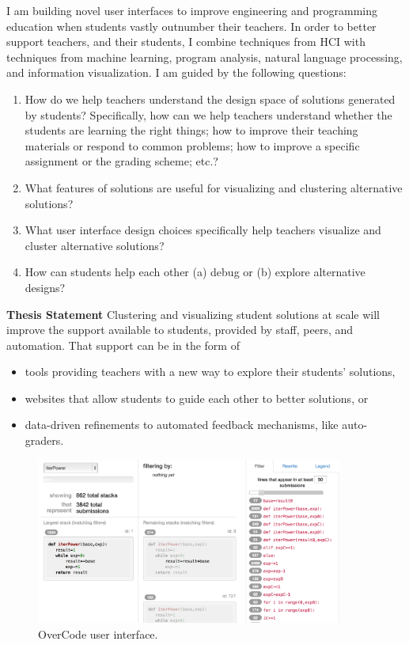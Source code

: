 \documentclass{sigchi}
\begin{document}
I am building novel user interfaces to improve engineering and programming education when students vastly outnumber their teachers. In order to better support teachers, and their students, I combine techniques from HCI with techniques from machine learning, program analysis, natural language processing, and information visualization. I am guided by the following questions:
\begin{enumerate}
\item How do we help teachers understand the design space of solutions generated by students? Specifically, how can we help teachers understand whether the students are learning the right things; how to improve their teaching materials or respond to common problems; how to improve a specific assignment or the grading scheme; etc.?
\item What features of solutions are useful for visualizing and clustering alternative solutions?
\item What user interface design choices specifically help teachers visualize and cluster alternative solutions?
\item How can students help each other (a) debug or (b) explore alternative designs?
\end{enumerate}

{\bf Thesis Statement} Clustering and visualizing student solutions at scale will improve the support available to students, provided by staff, peers, and automation. That support can be in the form of 
\begin{itemize}
\item tools providing teachers with a new way to explore their students' solutions,
\item websites that allow students to guide each other to better solutions, or 
\item data-driven refinements to automated feedback mechanisms, like auto-graders. 
\end{itemize}

\begin{figure}[t!]
\centering
\includegraphics[width=0.9\textwidth]{frontPageInterfacePreview.png}
\caption{OverCode user interface.}
\label{fig:figure1}
\end{figure}
\end{document}
